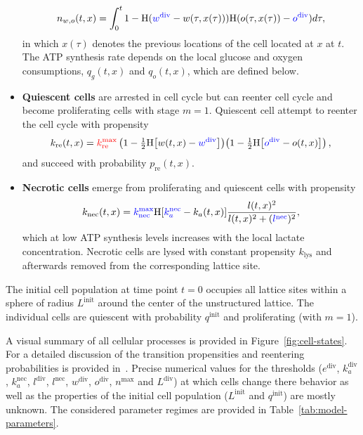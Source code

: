 \documentclass[10pt,letterpaper]{article}
\newcommand{\Heaviside}[1]{{\mathrm{H}\!\left[#1\right]}}
\newcommand{\sI}[1]{{\color{red}#1}}
\newcommand{\sII}[1]{{\color{blue}#1}}
\begin{document}
\begin{itemize}
\begin{equation*}
	n_{w,o}(t,x) = \int_{0}^{t}  1 -  \mathrm{H}(\sII{w^{\text{div}}}-w(\tau,x(\tau)))\mathrm{H}(o(\tau,x(\tau)) - \sII{o^{\text{div}}}) d\tau,
\end{equation*}
in which $x(\tau)$ denotes the previous locations of the cell located at $x$ at $t$. The ATP synthesis rate depends on the local glucose and oxygen consumptions, $q_g(t,x)$ and $q_o(t,x)$, which are defined below.
%
\item \textbf{Quiescent cells} are arrested in cell cycle but can reenter cell cycle and become proliferating cells with stage $m = 1$. Quiescent cell attempt to reenter the cell cycle with propensity
\begin{equation*}
	k_{\text{re}}(t,x) = \sI{k_{\text{re}}^{\max}} \left(1 - \tfrac{1}{2} \Heaviside{w(t,x)-\sII{w^{\text{div}}}}\right) \! \left(1 - \tfrac{1}{2} \Heaviside{\sII{o^{\text{div}}} - o(t,x)}\right),
\end{equation*}
and succeed with probability $p_{\text{re}}(t,x)$.
%
\item \textbf{Necrotic cells} emerge from proliferating and quiescent cells with propensity
\begin{equation*}
	k_{\text{nec}}(t,x) = \sII{k_{\text{nec}}^{\max}} \Heaviside{\sII{k_a^{\text{nec}}}-k_a(t,x)} \frac{l(t,x)^{2}}{l(t,x)^{2} + (\sII{l^{\text{nec}}})^{2}},
\end{equation*}
which at low ATP synthesis levels increases with the local lactate concentration. Necrotic cells are lysed with constant propensity $k_{\text{lys}}$ and afterwards removed from the corresponding lattice site.
\end{itemize}
The initial cell population at time point $t = 0$ occupies all lattice sites within a sphere of radius \sI{$L^{\text{init}}$} around the center of the unstructured lattice. The individual cells are quiescent with probability \sI{$q^{\text{init}}$} and proliferating (with $m=1$). 

A visual summary of all cellular processes is provided in Figure~\ref{fig:cell-states}. For a detailed discussion of the transition propensities and reentering probabilities is provided in~\cite{Jagiella2012,JagiellaMul2015}. Precise numerical values for the thresholds ($e^{\text{div}}$, $k_a^{\text{div}}$, $k_a^{\text{nec}}$, $l^{\text{div}}$, $l^{\text{nec}}$, $w^{\text{div}}$, $o^{\text{div}}$, $n^{\max}$ and $L^{\text{div}}$) at which cells change there behavior as well as the properties of the initial cell population (\sI{$L^{\text{init}}$} and \sI{$q^{\text{init}}$}) are mostly unknown. The considered parameter regimes are provided in Table~\ref{tab:model-parameters}.
\end{document}
